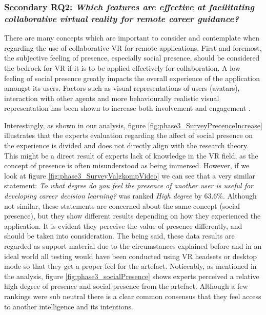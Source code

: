 \subsubsection{Secondary RQ2: \textit{Which features are effective at facilitating collaborative virtual reality for remote
career guidance?}} 
There are many concepts which are important to consider and contemplate when regarding the use of collaborative VR for remote applications. First and foremost, the subjective feeling of presence, especially social presence, should be considered the bedrock for VR if it is to be applied effectively for collaboration. A low feeling of social presence greatly impacts the overall experience of the application amongst its users. Factors such as visual representations of users (avatars), interaction with other agents and more behaviourally realistic visual representation has been shown to increase both involvement and engagement \cite{skalski2007role} \cite{oh2018systematic}. 

Interestingly, as shown in our analysis, figure \ref{fig:phase3_SurveyPrecenceIncrease} illustrates that the experts evaluation regarding the affect of social presence on the experience is divided and does not directly align with the research theory. This might be a direct result of experts lack of knowledge in the VR field, as the concept of presence is often misunderstood as being immersed. However, if we look at figure \ref{fig:phase3_SurveyValgkompVideo} we can see that a very similar statement: \textit{To what degree do you feel the presence of another user is useful for developing career decision learning?} was ranked \textit{High degree} by 63.6\%. Although not similar, these statements are concerned about the same concept (social presence), but they show different results depending on how they experienced the application. It is evident they perceive the value of presence differently, and should be taken into consideration. The being said, these data results are regarded as support material due to the circumstances explained before and in an ideal world all testing would have been conducted using VR headsets or desktop mode so that they get a proper feel for the artefact. 
Noticeably, as mentioned in the analysis, figure \ref{fig:phase3_socialPresence} shows experts perceived a relative high degree of presence and social presence from the artefact. Although a few rankings were sub neutral there is a clear common consensus that they feel access to another intelligence and its intentions.

